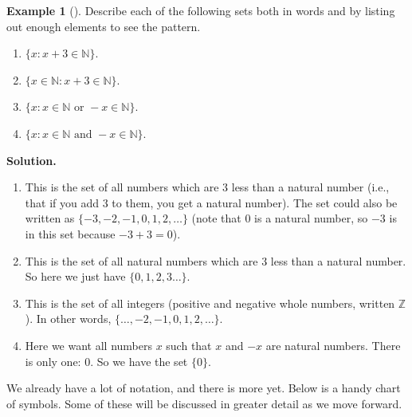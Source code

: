 \documentclass[12pt,]{book}
\theoremstyle{plain}
\theoremstyle{definition}
\theoremstyle{definition}
\newtheorem{example}[theorem]{Example}
\theoremstyle{definition}
\numberwithin{equation}{chapter}
\newcommand{\N}{\mathbb N}
\newcommand{\Z}{\mathbb Z}
\newcommand{\st}{:}
\begin{document}
\begin{example}[]\label{example-28}
\hypertarget{p-525}{}%
Describe each of the following sets both in words and by listing out enough elements to see the pattern.%
\par
\hypertarget{p-526}{}%
\leavevmode%
\begin{enumerate}
\item\hypertarget{li-200}{}\(\{x \st x + 3 \in \N\}\).%
\item\hypertarget{li-201}{}\(\{x \in \N \st x + 3 \in \N\}\).%
\item\hypertarget{li-202}{}\(\{x \st x \in \N \text{ or } -x \in \N\}\).%
\item\hypertarget{li-203}{}\(\{x \st x \in \N \text{ and } -x \in \N\}\).%
\end{enumerate}
%
\par\smallskip%
\noindent\textbf{Solution.}\hypertarget{solution-63}{}\quad%
\hypertarget{p-527}{}%
\leavevmode%
\begin{enumerate}
\item\hypertarget{li-204}{}\hypertarget{p-528}{}%
This is the set of all numbers which are 3 less than a natural number (i.e., that if you add 3 to them, you get a natural number). The set could also be written as \(\{-3, -2, -1, 0, 1, 2, \ldots\}\) (note that 0 is a natural number, so \(-3\) is in this set because \(-3 + 3 = 0\)).%
\item\hypertarget{li-205}{}\hypertarget{p-529}{}%
This is the set of all natural numbers which are 3 less than a natural number. So here we just have \(\{0, 1, 2,3 \ldots\}\).%
\item\hypertarget{li-206}{}\hypertarget{p-530}{}%
This is the set of all integers  (positive and negative whole numbers, written \(\Z\)). In other words, \(\{\ldots, -2, -1, 0, 1, 2, \ldots\}\).%
\item\hypertarget{li-207}{}\hypertarget{p-531}{}%
Here we want all numbers \(x\) such that \(x\) and \(-x\) are natural numbers. There is only one: 0. So we have the set \(\{0\}\).%
\end{enumerate}
%
\end{example}
\hypertarget{p-532}{}%
We already have a lot of notation, and there is more yet. Below is a handy chart of symbols. Some of these will be discussed in greater detail as we move forward.%
\end{document}
